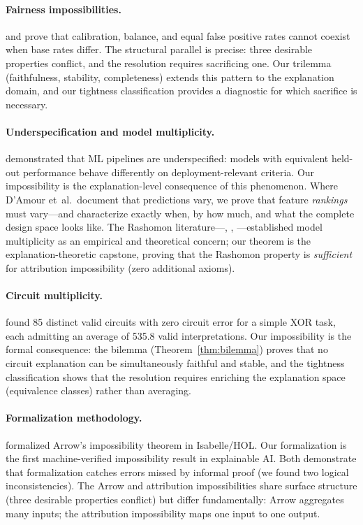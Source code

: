 \paragraph{Fairness impossibilities.}
\citet{chouldechova2017fair} and \citet{kleinberg2017inherent} prove that calibration, balance, and equal false positive rates cannot coexist when base rates differ. The structural parallel is precise: three desirable properties conflict, and the resolution requires sacrificing one. Our trilemma (faithfulness, stability, completeness) extends this pattern to the explanation domain, and our tightness classification provides a diagnostic for which sacrifice is necessary.

\paragraph{Underspecification and model multiplicity.}
\citet{damour2022underspecification} demonstrated that ML pipelines are underspecified: models with equivalent held-out performance behave differently on deployment-relevant criteria. Our impossibility is the explanation-level consequence of this phenomenon. Where D'Amour et~al.\ document that predictions vary, we prove that feature \emph{rankings} must vary---and characterize exactly when, by how much, and what the complete design space looks like. The Rashomon literature---\citet{breiman2001random}, \citet{fisher2019models}, \citet{semenova2022existence}---established model multiplicity as an empirical and theoretical concern; our theorem is the explanation-theoretic capstone, proving that the Rashomon property is \emph{sufficient} for attribution impossibility (zero additional axioms).

\paragraph{Circuit multiplicity.}
\citet{meloux2025circuits} found 85 distinct valid circuits with zero circuit error for a simple XOR task, each admitting an average of 535.8 valid interpretations. Our impossibility is the formal consequence: the bilemma (Theorem~\ref{thm:bilemma}) proves that no circuit explanation can be simultaneously faithful and stable, and the tightness classification shows that the resolution requires enriching the explanation space (equivalence classes) rather than averaging.

\paragraph{Formalization methodology.}
\citet{nipkow2009social} formalized Arrow's impossibility theorem in Isabelle/HOL. Our formalization is the first machine-verified impossibility result in explainable AI. Both demonstrate that formalization catches errors missed by informal proof (we found two logical inconsistencies). The Arrow and attribution impossibilities share surface structure (three desirable properties conflict) but differ fundamentally: Arrow aggregates many inputs; the attribution impossibility maps one input to one output.

